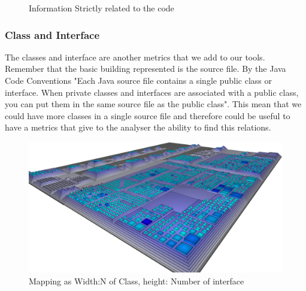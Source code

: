 \documentclass[]{usiinfbachelorproject}
\begin{document}
\begin{figure}[h]
\centering
{}
\hspace*{\fill}

\caption{Information Strictly related to the code}
\label{fig:strictly}

\end{figure}

\subsubsection{Class and Interface}

The classes and  interface are another metrics that we add to our tools. Remember that the basic building represented is the source file.  By the Java Code Conventions \cite{oracle}  "Each Java source file contains a single public class or interface. When private classes and
interfaces are associated with a public class, you can put them in the same source file as the public class". This mean that we could have more classes in a single source file and therefore could be useful to have a metrics that give to the analyser the ability to find this relations.

\begin{figure}[h]
\centering
\includegraphics[width=.60\textwidth]{images/ClassesAndInterfaces}
\caption[Classes and Interfaces Mapping]{Mapping as Width:N of Class, height: Number of interface \label{fig:classInterface}
}
	
\end{figure}
\end{document}

